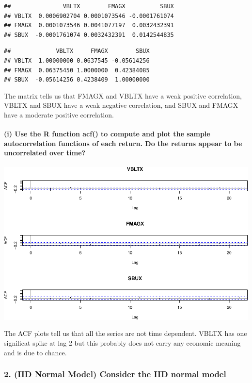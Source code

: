 \documentclass[]{article}
\let\oldparagraph\paragraph
\renewcommand{\paragraph}[1]{\oldparagraph{#1}\mbox{}}
\begin{document}
\begin{verbatim}
##               VBLTX        FMAGX          SBUX
## VBLTX  0.0006902704 0.0001073546 -0.0001761074
## FMAGX  0.0001073546 0.0041077197  0.0032432391
## SBUX  -0.0001761074 0.0032432391  0.0142544835
\end{verbatim}

\begin{verbatim}
##             VBLTX     FMAGX        SBUX
## VBLTX  1.00000000 0.0637545 -0.05614256
## FMAGX  0.06375450 1.0000000  0.42384085
## SBUX  -0.05614256 0.4238409  1.00000000
\end{verbatim}

The matrix tells us that FMAGX and VBLTX have a weak positive
correlation, VBLTX and SBUX have a weak negative correlation, and SBUX
and FMAGX have a moderate positive correlation.

\paragraph{(i) Use the R function acf() to compute and plot the sample
autocorrelation functions of each return. Do the returns appear to be
uncorrelated over
time?}\label{i-use-the-r-function-acf-to-compute-and-plot-the-sample-autocorrelation-functions-of-each-return.-do-the-returns-appear-to-be-uncorrelated-over-time}

\includegraphics{homework_4_markdown_files/figure-latex/unnamed-chunk-13-1.pdf}

The ACF plots tell us that all the series are not time dependent. VBLTX
has one significat spike at lag 2 but this probably does not carry any
economic meaning and is due to chance.

\subsubsection{2. (IID Normal Model) Consider the IID normal
model}\label{iid-normal-model-consider-the-iid-normal-model}
\end{document}
